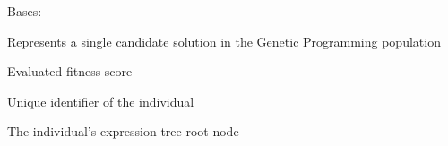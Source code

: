 \documentclass[letterpaper,10pt,english]{sphinxmanual}
\begin{document}
\begin{fulllineitems}
\label{\detokenize{api:scheduler.Individual}}
\pysigstartsignatures
\pysigline
{}
\pysigstopsignatures
\sphinxAtStartPar
Bases: 

\sphinxAtStartPar
Represents a single candidate solution in the Genetic Programming population

\begin{fulllineitems}
\label{\detokenize{api:scheduler.Individual.fitness}}
\pysigstartsignatures
\pysigline
{}
\pysigstopsignatures
\sphinxAtStartPar
Evaluated fitness score

\end{fulllineitems}


\begin{fulllineitems}
\label{\detokenize{api:scheduler.Individual.id}}
\pysigstartsignatures
\pysigline
{}
\pysigstopsignatures
\sphinxAtStartPar
Unique identifier of the individual

\end{fulllineitems}


\begin{fulllineitems}
\label{\detokenize{api:scheduler.Individual.tree}}
\pysigstartsignatures
\pysigline
{}
\pysigstopsignatures
\sphinxAtStartPar
The individual’s expression tree root node

\end{fulllineitems}


\end{fulllineitems}

\end{document}
